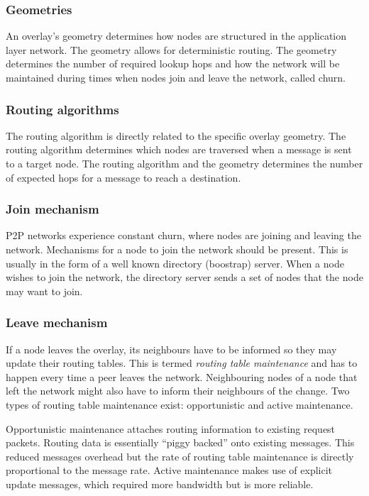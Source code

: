 \subsubsection{Geometries}

An overlay's geometry determines how nodes are structured in the application layer network. The geometry allows for deterministic routing. The geometry determines the number of required lookup hops and how the network will be maintained during times when nodes join and leave the network, called churn.

\subsubsection{Routing algorithms}

The routing algorithm is directly related to the specific overlay geometry. The routing algorithm determines which nodes are traversed when a message is sent to a target node. The routing algorithm and the geometry determines the number of expected hops for a message to reach a destination.

\subsubsection{Join mechanism}

P2P networks experience constant churn, where nodes are joining and leaving the network. Mechanisms for a node to join the network should be present. This is usually in the form of a well known directory (boostrap) server. When a node wishes to join the network, the directory server sends a set of nodes that the node may want to join.

\subsubsection{Leave mechanism}

If a node leaves the overlay, its neighbours have to be informed so they may update their routing tables. This is termed \emph{routing table maintenance} and has to happen every time a peer leaves the network. Neighbouring nodes of a node that left the network might also have to inform their neighbours of the change. Two types of routing table maintenance exist: opportunistic and active maintenance.

Opportunistic maintenance attaches routing information to existing request packets. Routing data is essentially ``piggy backed'' onto existing messages. This reduced messages overhead but the rate of routing table maintenance is directly proportional to the message rate. Active maintenance makes use of explicit update messages, which required more bandwidth but is more reliable.



